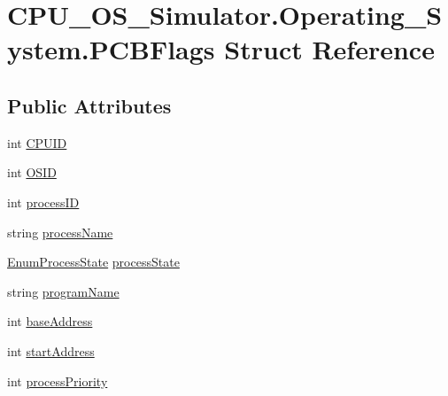 \hypertarget{struct_c_p_u___o_s___simulator_1_1_operating___system_1_1_p_c_b_flags}{}\section{C\+P\+U\+\_\+\+O\+S\+\_\+\+Simulator.\+Operating\+\_\+\+System.\+P\+C\+B\+Flags Struct Reference}
\label{struct_c_p_u___o_s___simulator_1_1_operating___system_1_1_p_c_b_flags}
\subsection*{Public Attributes}
\begin{DoxyCompactItemize}
\item 
int \hyperlink{struct_c_p_u___o_s___simulator_1_1_operating___system_1_1_p_c_b_flags_a15deeacce9002beb7f23aee161337daa}{C\+P\+U\+I\+D}
\item 
int \hyperlink{struct_c_p_u___o_s___simulator_1_1_operating___system_1_1_p_c_b_flags_ac8d5b519b8ac16523a5ec55ab8817f46}{O\+S\+I\+D}
\item 
int \hyperlink{struct_c_p_u___o_s___simulator_1_1_operating___system_1_1_p_c_b_flags_a648ddc7bcd96828ab1cf7489f5398b9d}{process\+I\+D}
\item 
string \hyperlink{struct_c_p_u___o_s___simulator_1_1_operating___system_1_1_p_c_b_flags_a49d8713f36371532f71d671779a16bef}{process\+Name}
\item 
\hyperlink{namespace_c_p_u___o_s___simulator_1_1_operating___system_a836ee2204e78fcb3a7dd6c3c942b1a24}{Enum\+Process\+State} \hyperlink{struct_c_p_u___o_s___simulator_1_1_operating___system_1_1_p_c_b_flags_af76336097aeb72498846b6457034ae5d}{process\+State}
\item 
string \hyperlink{struct_c_p_u___o_s___simulator_1_1_operating___system_1_1_p_c_b_flags_a27fe0cc9b4e732eda70d5574556cd2e0}{program\+Name}
\item 
int \hyperlink{struct_c_p_u___o_s___simulator_1_1_operating___system_1_1_p_c_b_flags_a11469ad59c9f9f3e36c95f8ae64f9c73}{base\+Address}
\item 
int \hyperlink{struct_c_p_u___o_s___simulator_1_1_operating___system_1_1_p_c_b_flags_a774bd0d595863252698e5dfc36015c50}{start\+Address}
\item 
int \hyperlink{struct_c_p_u___o_s___simulator_1_1_operating___system_1_1_p_c_b_flags_a1292a1914e95ca0fce7d55c604eab09b}{process\+Priority}

\end{DoxyCompactItemize}
